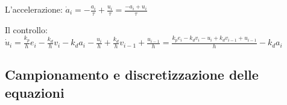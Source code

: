 \noindent L'accelerazione: \(\Dot{a}_i = -\frac{a_i}{\tau} + \frac{u_i}{\tau} = \frac{-a_i+u_i}{\tau}\)
\newline

\noindent Il controllo: \(\Dot{u}_i = \frac{k_p}{h}e_i -\frac{k_d}{h}v_i - k_da_i - \frac{u_i}{h} + \frac{k_d}{h}v_{i-1} + \frac{u_{i-1}}{h} = \frac{k_pe_i - k_dv_i - u_i + k_dv_{i-1} + u_{i-1}}{h} - k_da_i\)

\newpage
\subsection{Campionamento e discretizzazione delle equazioni}

